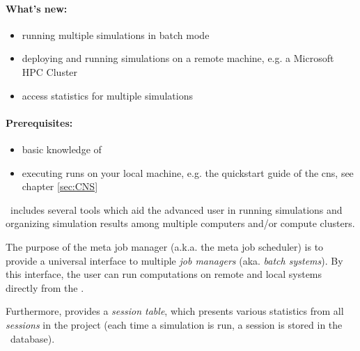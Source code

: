 
\graphicspath{{MetaJobManager/MetaJobManager.texbatch/}}

\paragraph{What's new:} 
\begin{itemize}
	\item running multiple simulations in batch mode
	\item deploying and running simulations on a remote machine, e.g. a Microsoft HPC Cluster
	\item access statistics for multiple simulations
\end{itemize}

\paragraph{Prerequisites:} 
\begin{itemize}
	\item basic knowledge of \BoSSSpad{}
	\item executing runs on your local machine, e.g. the quickstart guide of the \ac{cns}, see chapter \ref{sec:CNS}
\end{itemize}

\BoSSS ~includes several tools which aid the advanced user in running simulations and organizing simulation results among multiple computers and/or compute clusters.


The purpose of the meta job manager (a.k.a. the meta job scheduler)
is to provide a universal interface to multiple \emph{job managers} (aka. \emph{batch systems}).
By this interface, the user can run computations on remote and local systems directly from the \BoSSSpad{}.

Furthermore, \BoSSSpad{}  provides a \emph{session table},
which presents various statistics from all \emph{sessions} in the project
(each time a simulation is run, a session is stored in the \BoSSS ~database).

